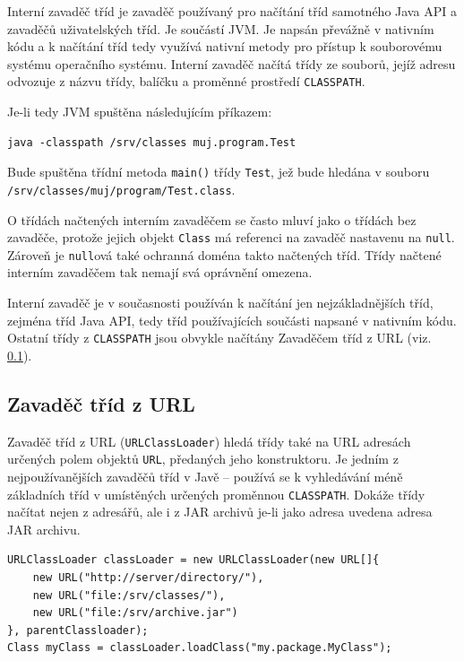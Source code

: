 Interní zavaděč tříd je zavaděč používaný pro načítání tříd samotného Java API a zavaděčů uživatelských tříd.
Je součástí JVM. Je napsán převážně v nativním kódu a k načítání tříd tedy využívá nativní metody pro přístup k souborovému systému operačního systému.
Interní zavaděč načítá třídy ze souborů, jejíž adresu odvozuje z názvu třídy, balíčku a proměnné prostředí {\tt CLASSPATH}. \cite[3.2.1]{oaks}

Je-li tedy JVM spuštěna následujícím příkazem:

\begin{lstlisting}[caption=Spuštění JVM s předefinovanou proměnnou {\tt CLASSPATH}, label=javaClasspath]
java -classpath /srv/classes muj.program.Test
\end{lstlisting}

Bude spuštěna třídní metoda {\tt main()} třídy {\tt Test}, jež bude hledána v souboru {\tt /srv/classes/muj/program/Test.class}.

O třídách načtených interním zavaděčem se často mluví jako o třídách bez zavaděče, protože jejich objekt {\tt Class} má referenci na zavaděč nastavenu na {\tt null}. \cite[3.2.1]{oaks} Zároveň je {\tt null}ová také ochranná doména takto načtených tříd. Třídy načtené interním zavaděčem tak nemají svá oprávnění omezena. \cite[5.4]{oaks}

Interní zavaděč je v současnosti používán k načítání jen nejzákladnějších tříd, zejména tříd Java API, tedy tříd používajících součásti napsané v nativním kódu. Ostatní třídy z {\tt CLASSPATH} jsou obvykle načítány Zavaděčem tříd z URL (viz. \ref{URLClassLoader}).

\subsection{Zavaděč tříd z URL} \label{URLClassLoader}

Zavaděč tříd z URL ({\tt URLClassLoader}) hledá třídy také na URL adresách určených polem objektů {\tt URL}, předaných jeho konstruktoru. Je jedním z nejpoužívanějších zavaděčů tříd v Javě -- používá se k vyhledávání méně základních tříd v umístěných určených proměnnou {\tt CLASSPATH}. Dokáže třídy načítat nejen z adresářů, ale i z JAR archivů je-li jako adresa uvedena adresa JAR archivu. \cite[3.2.5]{oaks}

\begin{lstlisting}[caption=Vytvoření vlastní instance zavaděče tříd z URL, label=urlclassloader]
URLClassLoader classLoader = new URLClassLoader(new URL[]{
    new URL("http://server/directory/"),
    new URL("file:/srv/classes/"),
    new URL("file:/srv/archive.jar")
}, parentClassloader);
Class myClass = classLoader.loadClass("my.package.MyClass");
\end{lstlisting}

